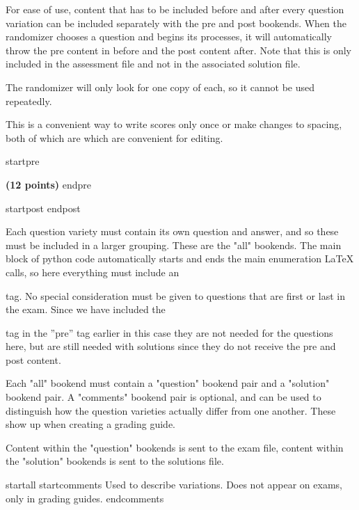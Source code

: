 


For ease of use, content that has to be included before and after every question variation can be included separately with the pre and post bookends. When the randomizer chooses a question and begins its processes, it will automatically throw the pre content in before and the post content after. Note that this is only included in the assessment file and not in the associated solution file.

The randomizer will only look for one copy of each, so it cannot be used repeatedly.

This is a convenient way to write scores only once or make changes to spacing, both of which are which are convenient for editing. 

startpre
\item {\bf (12 points)} 
endpre

startpost
\vfill 
endpost






Each question variety must contain its own question and answer, and so these must be included in a larger grouping. These are the "all" bookends. The main block of python code automatically starts and ends the main enumeration LaTeX calls, so here everything must include an \item tag. No special consideration must be given to questions that are first or last in the exam. Since we have included the \item tag in the ''pre'' tag earlier in this case they are not needed  for the questions here, but are still needed with solutions since they do not receive the pre and post content.

Each "all" bookend must contain a "question" bookend pair and a  "solution" bookend pair. A "comments" bookend pair is optional, and can be used to distinguish how the question varieties actually differ from one another. These show up when creating a grading guide.

Content within the "question" bookends is sent to the exam file, content within the "solution" bookends is sent to the solutions file.

startall
startcomments
Used to describe variations. Does not appear on exams, only in grading guides.
endcomments

